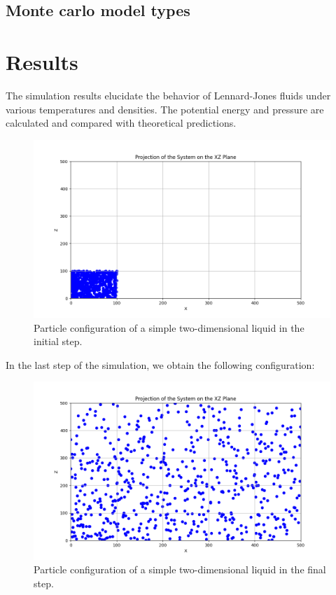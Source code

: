 \documentclass[a4paper,12pt]{article}
\begin{document}
\subsection{Monte carlo model types}



\section{Results}
The simulation results elucidate the behavior of Lennard-Jones fluids under various temperatures and densities. The potential energy and pressure are calculated and compared with theoretical predictions.

\begin{figure}[H]
    \centering
    \includegraphics[width=13cm]{images/02.png}
    \caption{Particle configuration of a simple two-dimensional liquid in the initial step.}
    \label{fig:initial}
\end{figure}

In the last step of the simulation, we obtain the following configuration:
\begin{figure}[H]
    \centering
    \includegraphics[width=12cm]{images/03.png}
    \caption{Particle configuration of a simple two-dimensional liquid in the final step.}
    \label{fig:final}
\end{figure}
\end{document}
